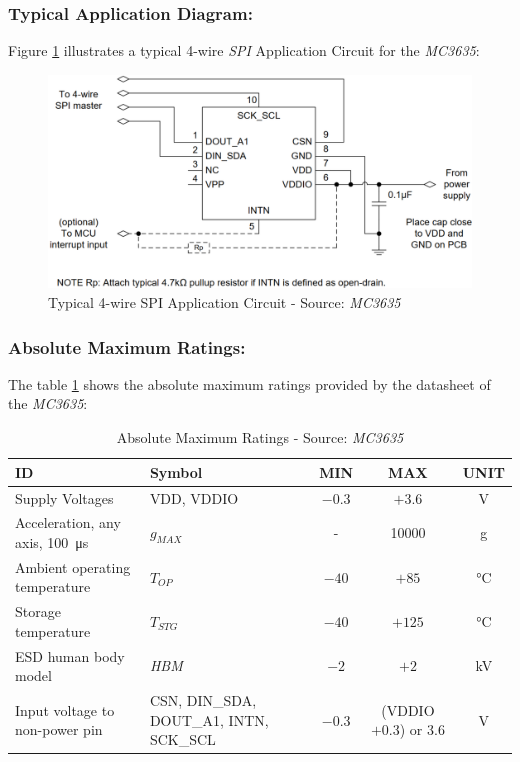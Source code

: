 \documentclass[report.tex]{subfiles}
\begin{document}
\pagebreak

\subsubsection{Typical Application Diagram:}\label{sec:accl_sel}

Figure \ref{fig:MC3635_typ_app_4spi} illustrates a typical 4-wire \textit{SPI} Application Circuit for the \textit{MC3635}:

\begin{figure}[H]
	\centering
	\includegraphics[width=1\textwidth]{Include/Figure/comp/MC3635_typ_app_4spi.png}
	\caption{Typical 4-wire SPI Application Circuit - Source: \textit{MC3635}\cite{MC3635}}
	\label{fig:MC3635_typ_app_4spi}
\end{figure}


\subsubsection{Absolute Maximum Ratings:}

The table \ref{tab:MC3635_absolute_max_rating} shows the absolute maximum ratings provided by the datasheet of the \textit{MC3635}:

\begin{table}[H]
\centering
\begin{tabularx}{\textwidth}{|X|X|c|c|c|}
\hline
\textbf{ID} & \textbf{Symbol} & \textbf{MIN} & \textbf{MAX} & \textbf{UNIT} \\\hline
Supply Voltages & VDD, VDDIO & $-0.3$ & $+3.6$ & \si{\volt} \\\hline
Acceleration, any axis, \SI{100}{\micro\second} & $g_{MAX}$ & - & 10000 & g \\\hline
Ambient operating temperature & $T_{OP}$ & $-40$ & $+85$ & \si{\celsius} \\\hline
Storage temperature & $T_{STG}$ & $-40$ & $+125$ & \si{\celsius} \\\hline
ESD human body model & \textit{HBM} & $-2$ & $+2$ & \si{\kilo\volt} \\\hline
Input voltage to non-power pin & CSN, DIN\_SDA, DOUT\_A1, INTN, SCK\_SCL & $-0.3$ & (VDDIO $+ 0.3$) or $3.6$ & \si{\volt} \\\hline
\end{tabularx}
\caption{Absolute Maximum Ratings - Source: \textit{MC3635}\cite{MC3635}}
\label{tab:MC3635_absolute_max_rating}
\end{table}
\end{document}
